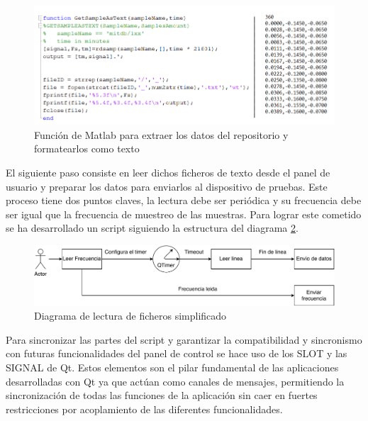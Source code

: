         \begin{figure} 
                \centering
                        \includegraphics[width =\linewidth]{figuras/MatlabFunc.png}
                \caption{Función de Matlab para extraer los datos del repositorio y formatearlos como texto}
                \label{fig:MAtlabFunc}
        \end{figure}

        El siguiente paso consiste en leer dichos ficheros de texto desde el panel de usuario y preparar los datos para enviarlos al dispositivo de pruebas. Este proceso tiene dos puntos claves, la lectura debe ser periódica y su frecuencia debe ser igual que la frecuencia de muestreo de las muestras. Para lograr este cometido se ha desarrollado un script siguiendo la estructura del diagrama \ref{fig:SimpleFileRead}. 

        \begin{figure}[H]  
                \centering
                        \includegraphics[width =\linewidth]{figuras/SimpleFileRead.pdf}
                \caption{Diagrama de lectura de ficheros simplificado}
                \label{fig:SimpleFileRead}
        \end{figure}

        Para sincronizar las partes del script y garantizar la compatibilidad y sincronismo con futuras funcionalidades del panel de control se hace uso de los SLOT y las SIGNAL de Qt. Estos elementos son el pilar fundamental de las aplicaciones desarrolladas con Qt ya que actúan como canales de mensajes, permitiendo la sincronización de todas las funciones de la aplicación sin caer en fuertes restricciones por acoplamiento de las diferentes funcionalidades.

